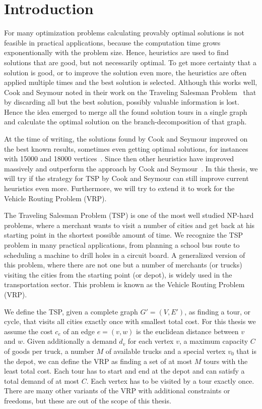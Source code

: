 \documentclass[titlepage, 12pt]{article}
\begin{document}
\section{Introduction}
\label{sec:introduction}
For many optimization problems calculating provably optimal solutions is not feasible in practical
applications, because the computation time grows exponentionally with the problem size. Hence,
heuristics are used to find solutions that are good, but not necessarily optimal.
To get more certainty that a solution is good, or to improve the solution even more, the heuristics
are often applied multiple times and the best solution is selected. Although this works well, Cook
and Seymour noted in their work on the Traveling Salesman Problem~\cite{cook-seymour} that by
discarding all but the best solution, possibly valuable information is lost. Hence the idea emerged
to merge all the found solution tours in a single graph and calculate the optimal solution on the
branch-decomposition of that graph.

At the time of writing, the solutions found by Cook and Seymour improved on the best known
results, sometimes even getting optimal solutions, for instances with 15000 and 18000
vertices~\cite{cook-seymour}. Since then other heuristics have improved massively and outperform the
approach by Cook and Seymour~\cite{lkh2}. In this thesis, we will try if the strategy for TSP by
Cook and Seymour can still improve current heuristics even more. Furthermore, we will try to extend
it to work for the Vehicle Routing Problem (VRP).

The Traveling Salesman Problem (TSP) is one of the most well studied NP-hard problems, where a
merchant wants to visit a number of cities and get back at his starting point in the shortest
possible amount of time.
We recognize the TSP problem in many practical applications, from planning a school bus route to
scheduling a machine to drill holes in a circuit board.
A generalized version of this problem, where there are not one but a number of merchants (or trucks)
visiting the cities from the starting point (or depot), is widely used in the transportation sector.
This problem is known as the Vehicle Routing Problem (VRP).

We define the TSP, given a complete graph $G' = (V, E')$, as finding a tour, or cycle, that visits
all cities exactly once with smallest total cost. For this thesis we assume the cost $c_e$ of an
edge $e = (v, w)$ is the euclidean distance between $v$ and $w$.
Given additionally a demand $d_v$ for each vertex $v$, a maximum capacity $C$ of goods per truck, a
number $M$ of available trucks and a special vertex $v_0$ that is the depot, we can define the VRP
as finding a set of at most $M$ tours with the least total cost. Each tour has to start and end at
the depot and can satisfy a total demand of at most $C$. Each vertex has to be visited by a tour
exactly once.
There are many other variants of the VRP with additional constraints or freedoms, but these are out
of the scope of this thesis.
\end{document}
